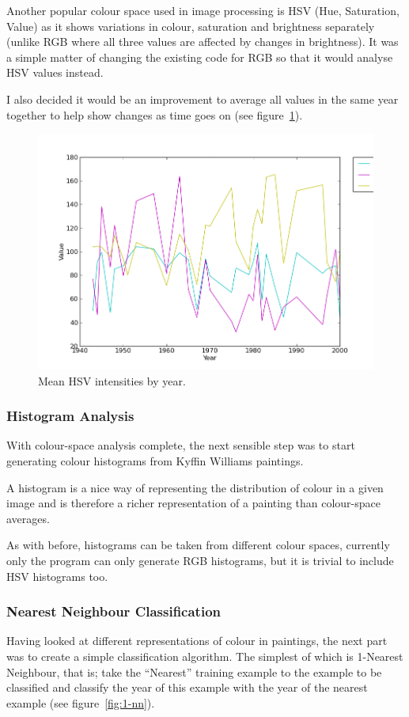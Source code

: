 \documentclass[11pt,fleqn,twoside]{article}
\begin{document}
Another popular colour space used in image processing is HSV (Hue, Saturation, Value) as it shows
variations in colour, saturation and brightness separately (unlike RGB where all three values are
affected by changes in brightness). It was a simple matter of changing the existing code for RGB
so that it would analyse HSV values instead.

I also decided it would be an improvement to average all values in the same year together to help
show changes as time goes on (see figure~\ref{fig:mean-hsv-by-year}).

\begin{figure}[p]
\includegraphics[scale=0.5]{img/hsv-legend-12-11-01.png}
\caption{Mean HSV intensities by year.}
\label{fig:mean-hsv-by-year}
\end{figure}


\subsubsection{Histogram Analysis}
With colour-space analysis complete, the next sensible step was to start generating colour 
histograms from Kyffin Williams paintings.

A histogram is a nice way of representing the distribution of colour in a given image and is 
therefore a richer representation of a painting than colour-space averages.

As with before, histograms can be taken from different colour spaces, currently only the program
can only generate RGB histograms, but it is trivial to include HSV histograms too.

\subsubsection{Nearest Neighbour Classification}
Having looked at different representations of colour in paintings, the next part was to create a 
simple classification algorithm. The simplest of which is 1-Nearest Neighbour, that is; take the 
``Nearest'' training example to the example to be classified and classify the year of this example 
with the year of the nearest example (see figure~\ref{fig:1-nn}).
\end{document}
